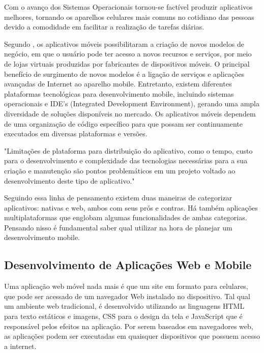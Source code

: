Com o avanço dos Sistemas Operacionais tornou-se factível produzir aplicativos melhores, tornando os aparelhos celulares mais comuns no cotidiano das pessoas devido a comodidade em facilitar a realização de tarefas diárias.

Segundo , os aplicativos móveis possibilitaram a criação de novos modelos de negócio, em que o usuário pode ter acesso a novos recursos e serviços, por meio de lojas virtuais produzidas por fabricantes de dispositivos móveis. O principal benefício de surgimento de novos modelos é a ligação de serviços e aplicações avançadas de Internet ao aparelho mobile. Entretanto, existem diferentes plataformas tecnológicas para desenvolvimento mobile, incluindo sistemas operacionais e IDE's  (Integrated Development Environment), gerando uma ampla diversidade de soluções disponíveis no mercado. Os aplicativos móveis dependem de uma organização de código específico para que possam ser continuamente executados em diversas plataformas e versões.

\begin{citacao}
	"Limitações de plataforma para distribuição do aplicativo, como o tempo, custo para o desenvolvimento e complexidade das tecnologias necessárias para a sua criação e manutenção são pontos problemáticos em um projeto voltado ao desenvolvimento deste tipo de aplicativo."\cite{emdesafios}
\end{citacao}

Seguindo essa linha de pensamento existem duas maneiras de categorizar
aplicativos: nativas e web, ambos com seus prós e contras. Há também aplicações multiplataformas que englobam algumas funcionalidades de ambas categorias. Pensando nisso é fundamental saber qual utilizar na hora de planejar um desenvolvimento mobile.

\subsection{Desenvolvimento de Aplicações Web e Mobile}

Uma aplicação web móvel nada mais é que um site em formato para celulares, que pode ser acessado de um navegador Web instalado no dispositivo. Tal qual um ambiente web tradicional, é desenvolvido utilizando as linguagens HTML para texto estáticos e imagens, CSS para o design da tela e JavaScript que é responsável pelos efeitos na aplicação. Por serem baseados em navegadores web, as aplicações podem ser executadas em quaisquer dispositivos que possuem acesso a internet.\cite{emdesafios}

